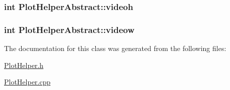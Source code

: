 \hypertarget{class_plot_helper_abstract_52f3eb0c2d21e58fc311f08b5fe9dc3f}{
\subsubsection[{videoh}]{\setlength{\rightskip}{0pt plus 5cm}int {\bf PlotHelperAbstract::videoh}}}
\label{class_plot_helper_abstract_52f3eb0c2d21e58fc311f08b5fe9dc3f}


\hypertarget{class_plot_helper_abstract_0fe7a92c0cf8e8b309713a9b8eebdedb}{
\subsubsection[{videow}]{\setlength{\rightskip}{0pt plus 5cm}int {\bf PlotHelperAbstract::videow}}}
\label{class_plot_helper_abstract_0fe7a92c0cf8e8b309713a9b8eebdedb}




The documentation for this class was generated from the following files:\begin{CompactItemize}
\item 
\hyperlink{_plot_helper_8h}{PlotHelper.h}\item 
\hyperlink{_plot_helper_8cpp}{PlotHelper.cpp}\end{CompactItemize}

